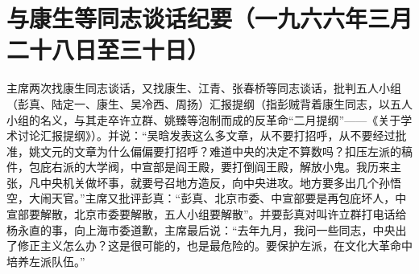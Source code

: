 \section[与康生等同志谈话纪要（一九六六年三月二十八日至三十日）]{与康生等同志谈话纪要（一九六六年三月二十八日至三十日）}


主席两次找康生同志谈话，又找康生、江青、张春桥等同志谈话，批判五人小组（彭真、陆定一、康生、吴冷西、周扬）汇报提纲（指彭贼背着康生同志，以五人小组的名义，与其走卒许立群、姚臻等泡制而成的反革命“二月提纲”——《关于学术讨论汇报提纲》）。并说：“吴晗发表这么多文章，从不要打招呼，从不要经过批准，姚文元的文章为什么偏偏要打招呼？难道中央的决定不算数吗？扣压左派的稿件，包庇右派的大学阀，中宣部是阎王殿，要打倒阎王殿，解放小鬼。我历来主张，凡中央机关做坏事，就要号召地方造反，向中央进攻。地方要多出几个孙悟空，大闹天官。”主席又批评彭真：“彭真、北京市委、中宣部要是再包庇坏人，中宣部要解散，北京市委要解散，五人小组要解散”。并要彭真对叫许立群打电话给杨永直的事，向上海市委道歉，主席最后说：“去年九月，我问一些同志，中央出了修正主义怎么办？这是很可能的，也是最危险的。要保护左派，在文化大革命中培养左派队伍。”


